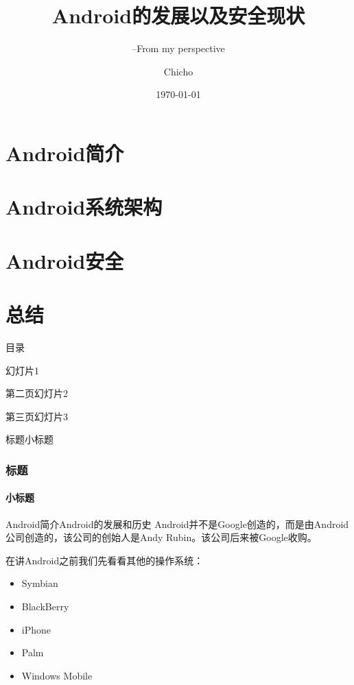 \documentclass{beamer}
\begin{document}
\section{Android简介}
 \section{Android系统架构}
 \section{Android安全}
 \section{总结}

\begin{frame}{目录}
 \tableofcontents
\end{frame}

\begin{frame}
幻灯片1
\end{frame}

\begin{frame}
第二页幻灯片2
\end{frame}

\begin{frame}
  第三页幻灯片3
\end{frame}

\begin{frame}
    \title[Android的介绍]{Android的发展以及安全现状}
    \subtitle {--From my perspective}
    \author{Chicho}
    \date{\today}
    \titlepage
\end{frame}

\begin{frame}{标题}{小标题}

\end{frame}

\begin{frame}
    \frametitle{标题}
    \framesubtitle{小标题}
\end{frame}

\begin{frame}{Android简介}{Android的发展和历史}
Android并不是Google创造的，而是由Android公司创造的，该公司的创始人是Andy Rubin。该公司后来被Google收购。

在讲Android之前我们先看看其他的操作系统：
    \begin{itemize}
\item Symbian
\item BlackBerry
\item iPhone
\item Palm
\item Windows Mobile
\end{itemize}
\end{frame}
\end{document}

